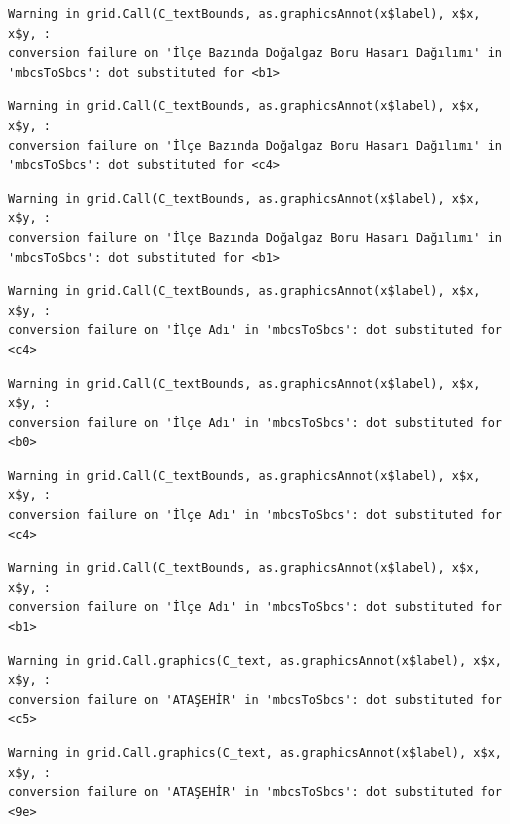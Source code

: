 \documentclass[
  11pt,
  a4paper,
  DIV=11,
  numbers=noendperiod]{scrartcl}
\begin{document}
\begin{verbatim}
Warning in grid.Call(C_textBounds, as.graphicsAnnot(x$label), x$x, x$y, :
conversion failure on 'İlçe Bazında Doğalgaz Boru Hasarı Dağılımı' in
'mbcsToSbcs': dot substituted for <b1>
\end{verbatim}

\begin{verbatim}
Warning in grid.Call(C_textBounds, as.graphicsAnnot(x$label), x$x, x$y, :
conversion failure on 'İlçe Bazında Doğalgaz Boru Hasarı Dağılımı' in
'mbcsToSbcs': dot substituted for <c4>
\end{verbatim}

\begin{verbatim}
Warning in grid.Call(C_textBounds, as.graphicsAnnot(x$label), x$x, x$y, :
conversion failure on 'İlçe Bazında Doğalgaz Boru Hasarı Dağılımı' in
'mbcsToSbcs': dot substituted for <b1>
\end{verbatim}

\begin{verbatim}
Warning in grid.Call(C_textBounds, as.graphicsAnnot(x$label), x$x, x$y, :
conversion failure on 'İlçe Adı' in 'mbcsToSbcs': dot substituted for <c4>
\end{verbatim}

\begin{verbatim}
Warning in grid.Call(C_textBounds, as.graphicsAnnot(x$label), x$x, x$y, :
conversion failure on 'İlçe Adı' in 'mbcsToSbcs': dot substituted for <b0>
\end{verbatim}

\begin{verbatim}
Warning in grid.Call(C_textBounds, as.graphicsAnnot(x$label), x$x, x$y, :
conversion failure on 'İlçe Adı' in 'mbcsToSbcs': dot substituted for <c4>
\end{verbatim}

\begin{verbatim}
Warning in grid.Call(C_textBounds, as.graphicsAnnot(x$label), x$x, x$y, :
conversion failure on 'İlçe Adı' in 'mbcsToSbcs': dot substituted for <b1>
\end{verbatim}

\begin{verbatim}
Warning in grid.Call.graphics(C_text, as.graphicsAnnot(x$label), x$x, x$y, :
conversion failure on 'ATAŞEHİR' in 'mbcsToSbcs': dot substituted for <c5>
\end{verbatim}

\begin{verbatim}
Warning in grid.Call.graphics(C_text, as.graphicsAnnot(x$label), x$x, x$y, :
conversion failure on 'ATAŞEHİR' in 'mbcsToSbcs': dot substituted for <9e>
\end{verbatim}
\end{document}
